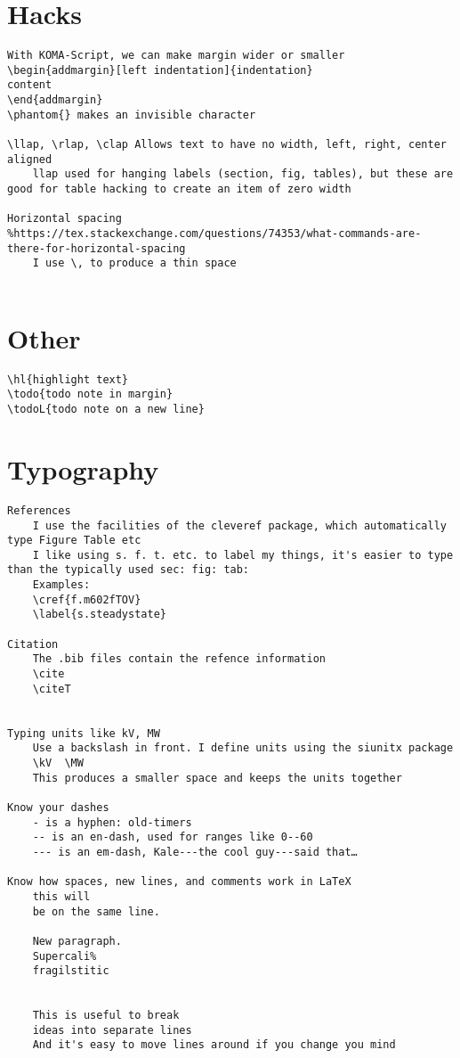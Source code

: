 \documentclass{corpboreport}
\begin{document}
\section{Hacks}

\lstset{language=tex}
\begin{lstlisting}
With KOMA-Script, we can make margin wider or smaller
\begin{addmargin}[left indentation]{indentation}
content
\end{addmargin}
\phantom{} makes an invisible character

\llap, \rlap, \clap	Allows text to have no width, left, right, center aligned
	llap used for hanging labels (section, fig, tables), but these are good for table hacking to create an item of zero width

Horizontal spacing	%https://tex.stackexchange.com/questions/74353/what-commands-are-there-for-horizontal-spacing
	I use \, to produce a thin space


\end{lstlisting}

\section{Other}

\begin{lstlisting}
\hl{highlight text}
\todo{todo note in margin}
\todoL{todo note on a new line}
\end{lstlisting}


\IntentionallyBlankPage


\section{Typography}

\begin{lstlisting}
References
	I use the facilities of the cleveref package, which automatically type Figure Table etc
	I like using s. f. t. etc. to label my things, it's easier to type than the typically used sec: fig: tab:
	Examples:
	\cref{f.m602fTOV}
	\label{s.steadystate}

Citation
	The .bib files contain the refence information
	\cite
	\citeT


Typing units like kV, MW
	Use a backslash in front. I define units using the siunitx package
	\kV  \MW
	This produces a smaller space and keeps the units together

Know your dashes
	- is a hyphen: old-timers
	-- is an en-dash, used for ranges like 0--60
	--- is an em-dash, Kale---the cool guy---said that…

Know how spaces, new lines, and comments work in LaTeX
	this will
	be on the same line.

	New paragraph.
	Supercali%
	fragilstitic


	This is useful to break
	ideas into separate lines
	And it's easy to move lines around if you change you mind
\end{lstlisting}
\end{document}
